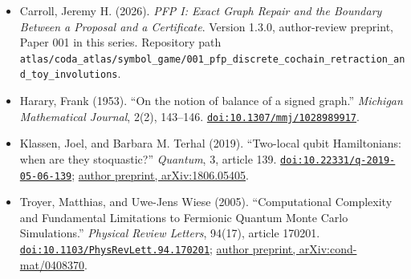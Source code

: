 \documentclass[
  11pt,
]{article}
\providecommand{\tightlist}{%
  \setlength{\itemsep}{0pt}\setlength{\parskip}{0pt}}
\begin{document}
\begin{itemize}
\tightlist
\item
  Carroll, Jeremy H. (2026). \emph{PFP I: Exact Graph Repair and the
  Boundary Between a Proposal and a Certificate}. Version 1.3.0,
  author-review preprint, Paper 001 in this series. Repository path
  \nolinkurl{atlas/coda_atlas/symbol_game/001_pfp_discrete_cochain_retraction_and_toy_involutions}.
\item
  Harary, Frank (1953). ``On the notion of balance of a signed graph.''
  \emph{Michigan Mathematical Journal}, 2(2), 143--146.
  \href{https://doi.org/10.1307/mmj/1028989917}{\nolinkurl{doi:10.1307/mmj/1028989917}}.
\item
  Klassen, Joel, and Barbara M. Terhal (2019). ``Two-local qubit
  Hamiltonians: when are they stoquastic?'' \emph{Quantum}, 3, article
  139.
  \href{https://doi.org/10.22331/q-2019-05-06-139}{\nolinkurl{doi:10.22331/q-2019-05-06-139}};
  \href{https://arxiv.org/abs/1806.05405}{author preprint,
  arXiv:1806.05405}.
\item
  Troyer, Matthias, and Uwe-Jens Wiese (2005). ``Computational
  Complexity and Fundamental Limitations to Fermionic Quantum Monte
  Carlo Simulations.'' \emph{Physical Review Letters}, 94(17), article
  170201.
  \href{https://doi.org/10.1103/PhysRevLett.94.170201}{\nolinkurl{doi:10.1103/PhysRevLett.94.170201}};
  \href{https://arxiv.org/abs/cond-mat/0408370}{author preprint,
  arXiv:cond-mat/0408370}.
\end{itemize}
\end{document}
